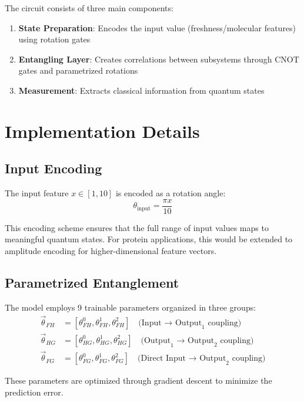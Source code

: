 \documentclass[11pt,a4paper]{article}
\begin{document}
The circuit consists of three main components:
\begin{enumerate}
    \item \textbf{State Preparation}: Encodes the input value (freshness/molecular features) using rotation gates
    \item \textbf{Entangling Layer}: Creates correlations between subsystems through CNOT gates and parametrized rotations
    \item \textbf{Measurement}: Extracts classical information from quantum states
\end{enumerate}

\section{Implementation Details}

\subsection{Input Encoding}

The input feature $x \in [1, 10]$ is encoded as a rotation angle:
\begin{equation}
\theta_{\text{input}} = \frac{\pi x}{10}
\end{equation}

This encoding scheme ensures that the full range of input values maps to meaningful quantum states. For protein applications, this would be extended to amplitude encoding for higher-dimensional feature vectors.

\subsection{Parametrized Entanglement}

The model employs 9 trainable parameters organized in three groups:
\begin{align}
\vec{\theta}_{FH} &= [\theta_{FH}^0, \theta_{FH}^1, \theta_{FH}^2] \quad \text{(Input → Output}_1\text{ coupling)} \\
\vec{\theta}_{HG} &= [\theta_{HG}^0, \theta_{HG}^1, \theta_{HG}^2] \quad \text{(Output}_1 \text{ → Output}_2\text{ coupling)} \\
\vec{\theta}_{FG} &= [\theta_{FG}^0, \theta_{FG}^1, \theta_{FG}^2] \quad \text{(Direct Input → Output}_2\text{ coupling)}
\end{align}

These parameters are optimized through gradient descent to minimize the prediction error.
\end{document}
